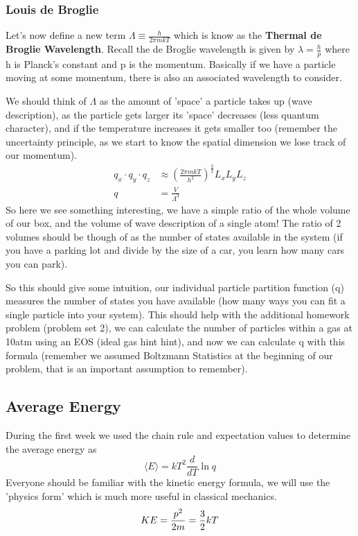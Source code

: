 \documentclass{article}
\begin{document}
 \subsubsection*{Louis de Broglie}
 Let's now define a new term $\Lambda \equiv \frac{h}{2\pi mkT}$ which is know as the \textbf{Thermal de Broglie Wavelength}. 
 Recall the de Broglie wavelength is given by $\lambda = \frac{h}{p}$ where h is Planck's constant and p is the momentum. 
 Basically if we have a particle moving at some momentum, there is also an associated wavelength to consider.
 
 We should think of $\Lambda$ as the amount of 'space' a particle takes up (wave description), as the particle gets larger its 'space' decreases (less quantum character), and if the temperature increases it gets smaller too (remember the uncertainty principle, as we start to know the spatial dimension we lose track of our momentum). 
  \begin{equation}
  \begin{split}
     q_x\cdot q_y \cdot q_z &\approx \left (\frac{2\pi mkT}{h^2} \right )^{\frac{3}{2}} L_xL_yL_z \\
     q &= \frac{V}{\Lambda^3}
       \end{split}
 \end{equation}
 So here we see something interesting, we have a simple ratio of the whole volume of our box, and the volume of wave description of a single atom!
 The ratio of 2 volumes should be though of as the number of states available in the system (if you have a parking lot and divide by the size of a car, you learn how many cars you can park). 
 
 So this should give some intuition, our individual particle partition function (q) measures the number of states you have available (how many ways you can fit a single particle into your system). 
 This should help with the additional homework problem (problem set 2), we can calculate the number of particles within a gas at 10atm using an EOS (ideal gas hint hint), and now we can calculate q with this formula (remember we assumed Boltzmann Statistics at the beginning of our problem, that is an important assumption to remember).  
 
 \subsection*{Average Energy}
 During the first week we used the chain rule and expectation values to determine the average energy as 
 \begin{equation}
      \langle E \rangle = kT^2 \frac{d}{dT} \ln q
 \end{equation}
  Everyone should be familiar with the kinetic energy formula, we will use the 'physics form' which is much more useful in classical mechanics. 
\begin{equation}
     KE = \frac{p^2}{2m} = \frac{3}{2}kT\\
 \end{equation}
 
\end{document}
